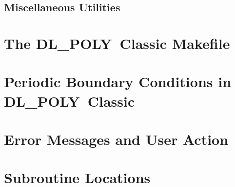 \documentclass[11pt,a4paper,dvipdfm]{report}
\newcommand{\D}{\mbox{DL\_POLY Classic}}
\begin{document}
\section{Miscellaneous Utilities}


\clearpage
{}



\clearpage
\appendix
{}


\chapter{The \D{} Makefile}

\chapter{Periodic Boundary Conditions in \D{}}

\chapter{Error Messages and User Action}

\chapter{Subroutine Locations}


\clearpage
{}
\printindex
\end{document}
